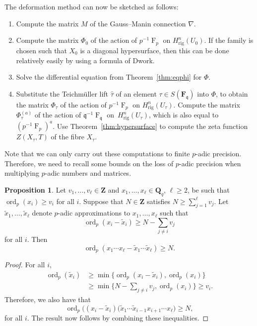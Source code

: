 \documentclass[a4paper,11pt]{article}
\numberwithin{equation}{section}
\newcommand{\ZZ}{\mathbf{Z}} %
\newcommand{\FF}{\mathbf{F}} %
\DeclareMathOperator{\ord}{ord}          %
\DeclareMathOperator{\Frob}{F}           %
\providecommand{\Hrig}{H_{\text{rig}}}  %
\theoremstyle{definition}
\newtheorem{prop}[thm]{Proposition}
\begin{document}
The deformation method can now be sketched as follows:
\begin{enumerate}[\it Step 1.]
\item Compute the matrix $M$ of the Gauss--Manin connection $\nabla$.
\item Compute the matrix $\Phi_0$ of the action of $p^{-1}\Frob_p$ on 
      $\Hrig^n(U_0)$. If the family is chosen such that $X_0$ is a diagonal 
      hypersurface, then this can be done relatively easily by using 
      a formula of Dwork.
\item Solve the differential equation from Theorem~\ref{thm:eqphi} for $\Phi$.
\item Substitute the Teichm\"uller lift $\hat{\tau}$ of an element 
      $\tau \in S(\FF_{\mathfrak{q}})$ into $\Phi$, to obtain the 
      matrix $\Phi_{\tau}$ of the action of $p^{-1}\Frob_p$ on 
      $\Hrig^n(U_{\tau})$. Compute the matrix $\Phi_{\tau}^{(a)}$ 
      of the action of $\mathfrak{q}^{-1} \Frob_{\mathfrak{q}}$ 
      on~$\Hrig^n(U_{\tau})$, which is also equal to $(p^{-1}\Frob_p)^a$.
      Use Theorem~\ref{thm:hypersurface} to compute the zeta function 
      $Z(X_{\tau},T)$ of the fibre $X_{\tau}$.
\end{enumerate}


Note that we can only carry out these computations to finite $p$-adic 
precision. Therefore, we need to recall some bounds on the loss of $p$-adic 
precision when multiplying $p$-adic numbers and matrices. 

\begin{prop} \label{prop:productval}
Let $v_1,\dotsc,v_{\ell} \in \ZZ$ and $x_1, \dotsc, x_{\ell} \in \mathbf{Q}_q$,  
$\ell \geq 2$, be such that $\ord_p(x_i) \geq v_i$ for all $i$. Suppose that 
$N \in \ZZ$ satisfies $N \geq \sum_{j=1}^{\ell} v_j$. Let 
$\tilde{x}_1, \dotsc, \tilde{x}_{\ell}$ denote $p$-adic approximations to 
$x_1, \dotsc, x_{\ell}$ such that 
\[
\ord_p(x_i - \tilde{x}_i) \geq N - \sum_{j \neq i} v_j
\] 
for all $i$.  Then 
\begin{equation*}
\ord_p(x_1 \dotsm x_{\ell} - \tilde{x}_1 \dotsm \tilde{x}_{\ell}) \geq N.
\end{equation*}
\end{prop}

\begin{proof}
For all $i$,
\begin{align*}
\ord_p(\tilde{x}_i) &\geq \min \{ \ord_p(x_i-\tilde{x}_i), \ord_p(x_i) \} \\
                    &\geq \min \{ N- \sum_{j \neq i} v_j, \ord_p(x_i)\} \geq v_i.
\end{align*}
Therefore, we also have that
\begin{equation*}
\ord_p \bigl( (x_{i}-\tilde{x}_{i})
    (\tilde{x}_1 \dotsm \tilde{x}_{i-1} x_{i+1} \dotsm x_{\ell} \bigr) \geq N,
\end{equation*}
for all $i$. The result now follows by combining these inequalities.
\end{proof}
\end{document}
